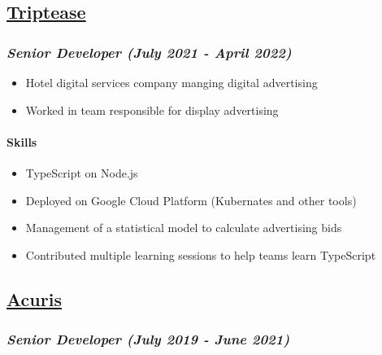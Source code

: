 \hypertarget{triptease}{%
\subsection{\texorpdfstring{\href{https://www.triptease.com/}{Triptease}}{Triptease}}\label{triptease}}

\hypertarget{senior-developer-july-2021---april-2022}{%
\subsubsection{\texorpdfstring{\emph{Senior Developer (July 2021 - April
2022)}}{Senior Developer (July 2021 - April 2022)}}\label{senior-developer-july-2021---april-2022}}

\begin{itemize}
\tightlist
\item
  Hotel digital services company manging digital advertising
\item
  Worked in team responsible for display advertising
\end{itemize}

\hypertarget{skills-triptease}{%
\paragraph{Skills}\label{skills-triptease}}

\begin{itemize}
\tightlist
\item
  TypeScript on Node.js
\item
  Deployed on Google Cloud Platform (Kubernates and other tools)
\item
  Management of a statistical model to calculate advertising bids
\item
  Contributed multiple learning sessions to help teams learn TypeScript
\end{itemize}

\hypertarget{acuris}{%
\subsection{\texorpdfstring{\href{http://www.acuris.com/}{Acuris}}{Acuris}}\label{acuris}}

\hypertarget{senior-developer-june-2019---present}{%
\subsubsection{\texorpdfstring{\emph{Senior Developer (July 2019 - June
2021)}}{Senior Developer (July 2019 - June 2021)}}\label{senior-developer-june-2019---present}}

